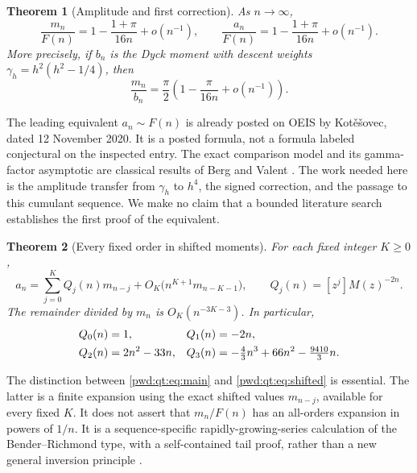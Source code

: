 \documentclass[11pt,letterpaper]{article}
\numberwithin{equation}{section}
\newtheorem{theorem}{Theorem}[section]
\theoremstyle{remark}\newtheorem{remark}[theorem]{Remark}
\begin{document}
\begin{theorem}[Amplitude and first correction]\label{pwd:qt:thm:main}
As $n\to\infty$,
\begin{equation}\label{pwd:qt:eq:main}
 \frac{m_n}{F(n)}=1-\frac{1+\pi}{16n}+o(n^{-1}),\qquad
 \frac{a_n}{F(n)}=1-\frac{1+\pi}{16n}+o(n^{-1}).
\end{equation}
More precisely, if $b_n$ is the Dyck moment with descent weights
$\gamma_h=h^2(h^2-1/4)$, then
\begin{equation}\label{pwd:qt:eq:comparison-main}
 \frac{m_n}{b_n}=\frac\pi2\left(1-\frac\pi{16n}+o(n^{-1})\right).
\end{equation}
\end{theorem}
The leading equivalent $a_n\sim F(n)$ is already posted on OEIS by Kot\v e\v sovec, dated 12 November 2020. It is a posted formula, not a formula labeled conjectural on the inspected entry. The exact comparison model and its gamma-factor asymptotic are classical results of Berg and Valent \cite{bergvalent}. The work needed here is the amplitude transfer from $\gamma_h$ to $h^4$, the signed correction, and the passage to this cumulant sequence. We make no claim that a bounded literature search establishes the first proof of the equivalent.

\begin{theorem}[Every fixed order in shifted moments]\label{pwd:qt:thm:shifted}
For each fixed integer $K\ge0$,
\begin{equation}\label{pwd:qt:eq:shifted}
 a_n=\sum_{j=0}^K Q_j(n)m_{n-j}
       +O_K\bigl(n^{K+1}m_{n-K-1}\bigr),\qquad
 Q_j(n)=[z^j]M(z)^{-2n}.
\end{equation}
The remainder divided by $m_n$ is $O_K(n^{-3K-3})$. In particular,
\begin{align}\label{pwd:qt:eq:qpolys}
 Q_0(n)&=1,&Q_1(n)&=-2n,\notag\\
 Q_2(n)&=2n^2-33n,&
 Q_3(n)&=-\tfrac43n^3+66n^2-\tfrac{9410}3n.
\end{align}
\end{theorem}
The distinction between \eqref{pwd:qt:eq:main} and \eqref{pwd:qt:eq:shifted} is essential. The latter is a finite expansion using the exact shifted values $m_{n-j}$, available for every fixed $K$. It does not assert that $m_n/F(n)$ has an all-orders expansion in powers of $1/n$. It is a sequence-specific rapidly-growing-series calculation of the Bender--Richmond type, with a self-contained tail proof, rather than a new general inversion principle \cite{bender,benderrichmond,borinsky}.
\end{document}

